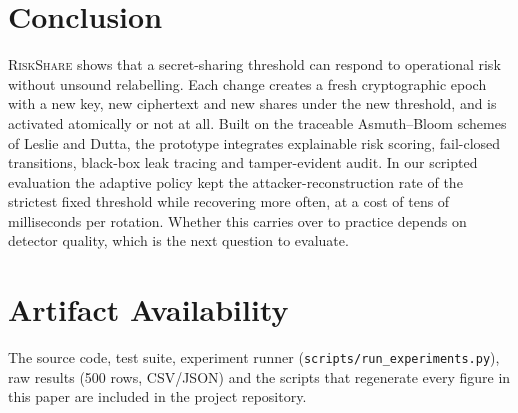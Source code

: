 \documentclass[conference]{IEEEtran}
\newcommand{\RS}{\textsc{RiskShare}}
\begin{document}
\section{Conclusion}
\label{sec:conclusion}
\RS{} shows that a secret-sharing threshold can respond to operational risk without unsound relabelling. Each change creates a fresh cryptographic epoch with a new key, new ciphertext and new shares under the new threshold, and is activated atomically or not at all. Built on the traceable Asmuth--Bloom schemes of Leslie and Dutta, the prototype integrates explainable risk scoring, fail-closed transitions, black-box leak tracing and tamper-evident audit. In our scripted evaluation the adaptive policy kept the attacker-reconstruction rate of the strictest fixed threshold while recovering more often, at a cost of tens of milliseconds per rotation. Whether this carries over to practice depends on detector quality, which is the next question to evaluate.

\section*{Artifact Availability}
The source code, test suite, experiment runner (\texttt{scripts/run\_experiments.py}), raw results (500 rows, CSV/JSON) and the scripts that regenerate every figure in this paper are included in the project repository.



\end{document}
